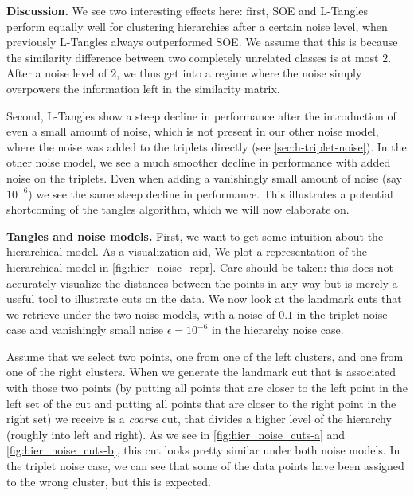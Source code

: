 \textbf{Discussion.}
We see two interesting effects here: first, SOE and L-Tangles perform equally well for clustering hierarchies after a certain noise level, when previously L-Tangles always outperformed
SOE. We assume that this is because the similarity difference between two completely unrelated classes is at most $2$. After a noise level 
of $2$, we thus get into a regime where the noise simply overpowers the information left in the similarity matrix.

Second, L-Tangles show a steep decline in performance after the introduction of even a small amount of noise, which is not present in our other noise model, 
where the noise was added to the triplets directly (see \autoref{sec:h-triplet-noise}).
In the other noise model, we see a much smoother decline in performance with added noise on the triplets. 
Even when adding a vanishingly small amount of noise (say $10^{-6}$) we see the same steep decline in performance. 
This illustrates a potential shortcoming of the tangles algorithm, which we will now elaborate on.

\textbf{Tangles and noise models.}
First, we want to get some intuition about the hierarchical model.
As a visualization aid, We plot a representation of the hierarchical model in \autoref{fig:hier_noise_repr}. Care should be taken: this does not accurately visualize the distances between
the points in any way but is merely a useful tool to illustrate cuts on the data. We now look at the landmark cuts that we retrieve under the two noise models, with a noise of $0.1$ in the triplet 
noise case and vanishingly small noise $\epsilon = 10^{-6}$ in the hierarchy noise case. 

Assume that we select two points, one from one of the left clusters, and one from one of the right clusters. When we generate the landmark cut that is associated with those two points
(by putting all points that are closer to the left point in the left set of the cut and putting all points that are closer to the right point in the right set) 
we receive is a \textit{coarse} cut, that divides a higher level of the hierarchy (roughly into left and right). As we see in \autoref{fig:hier_noise_cuts-a} and \autoref{fig:hier_noise_cuts-b}, 
this cut looks pretty similar under both noise models. 
In the triplet noise case, we can see that some of the data points have been assigned to the wrong cluster, but this is expected. 

